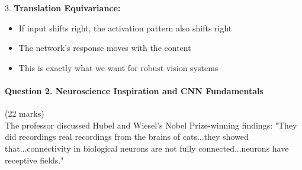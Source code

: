\documentclass[12pt]{article}
\begin{document}
\begin{enumerate}[(a)]
{{    3. \textbf{Translation Equivariance:}
    \begin{itemize}
        \item If input shifts right, the activation pattern also shifts right
        \item The network's response moves with the content
        \item This is exactly what we want for robust vision systems
    \end{itemize}
    }
    }
\end{enumerate}

\newpage
\paragraph{Question 2. Neuroscience Inspiration and CNN Fundamentals}{\hfill (22 marks)}\\
The professor discussed Hubel and Wiesel's Nobel Prize-winning findings: "They did recordings real recordings from the brains of cats...they showed that...connectivity in biological neurons are not fully connected...neurons have receptive fields."
\end{document}
